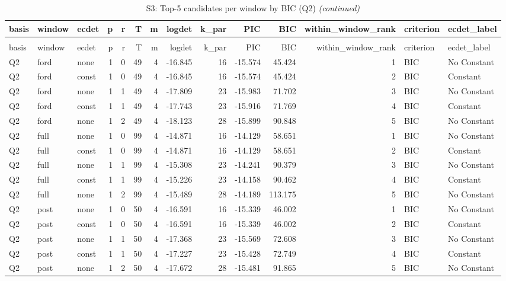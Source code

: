 \begingroup\fontsize{9}{11}\selectfont

\begin{longtable}[t]{lllrrrrrrrrrll}
\caption{\label{tab:tab:S3_bic_top5_Q2}S3: Top-5 candidates per window by BIC (Q2)}\\
\toprule
basis & window & ecdet & p & r & T & m & logdet & k\_par & PIC & BIC & within\_window\_rank & criterion & ecdet\_label\\
\midrule
\endfirsthead
\caption[]{S3: Top-5 candidates per window by BIC (Q2) \textit{(continued)}}\\
\toprule
basis & window & ecdet & p & r & T & m & logdet & k\_par & PIC & BIC & within\_window\_rank & criterion & ecdet\_label\\
\midrule
\endhead

\endfoot
\bottomrule
\endlastfoot
Q2 & ford & none & 1 & 0 & 49 & 4 & -16.845 & 16 & -15.574 & 45.424 & 1 & BIC & No Constant\\
Q2 & ford & const & 1 & 0 & 49 & 4 & -16.845 & 16 & -15.574 & 45.424 & 2 & BIC & Constant\\
Q2 & ford & none & 1 & 1 & 49 & 4 & -17.809 & 23 & -15.983 & 71.702 & 3 & BIC & No Constant\\
Q2 & ford & const & 1 & 1 & 49 & 4 & -17.743 & 23 & -15.916 & 71.769 & 4 & BIC & Constant\\
Q2 & ford & none & 1 & 2 & 49 & 4 & -18.123 & 28 & -15.899 & 90.848 & 5 & BIC & No Constant\\
\addlinespace
Q2 & full & none & 1 & 0 & 99 & 4 & -14.871 & 16 & -14.129 & 58.651 & 1 & BIC & No Constant\\
Q2 & full & const & 1 & 0 & 99 & 4 & -14.871 & 16 & -14.129 & 58.651 & 2 & BIC & Constant\\
Q2 & full & none & 1 & 1 & 99 & 4 & -15.308 & 23 & -14.241 & 90.379 & 3 & BIC & No Constant\\
Q2 & full & const & 1 & 1 & 99 & 4 & -15.226 & 23 & -14.158 & 90.462 & 4 & BIC & Constant\\
Q2 & full & none & 1 & 2 & 99 & 4 & -15.489 & 28 & -14.189 & 113.175 & 5 & BIC & No Constant\\
\addlinespace
Q2 & post & none & 1 & 0 & 50 & 4 & -16.591 & 16 & -15.339 & 46.002 & 1 & BIC & No Constant\\
Q2 & post & const & 1 & 0 & 50 & 4 & -16.591 & 16 & -15.339 & 46.002 & 2 & BIC & Constant\\
Q2 & post & none & 1 & 1 & 50 & 4 & -17.368 & 23 & -15.569 & 72.608 & 3 & BIC & No Constant\\
Q2 & post & const & 1 & 1 & 50 & 4 & -17.227 & 23 & -15.428 & 72.749 & 4 & BIC & Constant\\
Q2 & post & none & 1 & 2 & 50 & 4 & -17.672 & 28 & -15.481 & 91.865 & 5 & BIC & No Constant\\*
\end{longtable}
\endgroup{}
